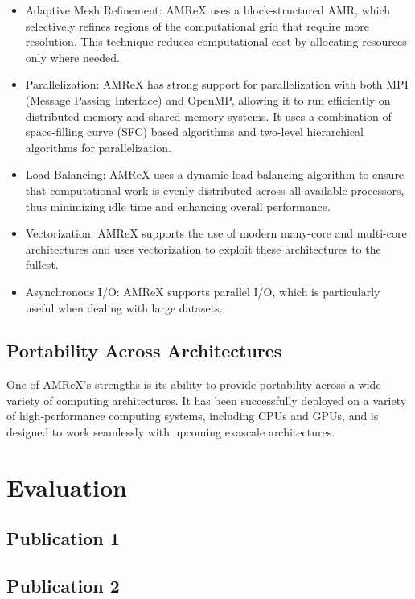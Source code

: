 \documentclass[12pt, a4paper]{article}
\begin{document}
\begin{itemize}
    \item Adaptive Mesh Refinement: AMReX uses a block-structured AMR, which selectively 
    refines regions of the computational grid that require more resolution.
    This technique reduces computational cost by allocating resources only where needed.
    \item Parallelization: AMReX has strong support for parallelization with both MPI (Message Passing Interface) 
    and OpenMP, allowing it to run efficiently on distributed-memory and shared-memory systems. 
    It uses a combination of space-filling curve (SFC) based algorithms and two-level hierarchical 
    algorithms for parallelization.
    \item Load Balancing: AMReX uses a dynamic load balancing algorithm to ensure that computational 
    work is evenly distributed across all available processors, thus minimizing idle time and enhancing 
    overall performance.
    \item Vectorization: AMReX supports the use of modern many-core and multi-core architectures 
    and uses vectorization to exploit these architectures to the fullest.
    \item Asynchronous I/O: AMReX supports parallel I/O, which is particularly useful when dealing with large datasets.
\end{itemize}



\subsection{Portability Across Architectures}

One of AMReX's strengths is its ability to provide portability across a wide variety 
of computing architectures. It has been successfully deployed on a variety of high-performance 
computing systems, including CPUs and GPUs, and is designed to work seamlessly 
with upcoming exascale architectures.

\section{Evaluation}
\subsection{Publication 1}
\subsection{Publication 2}
\end{document}
